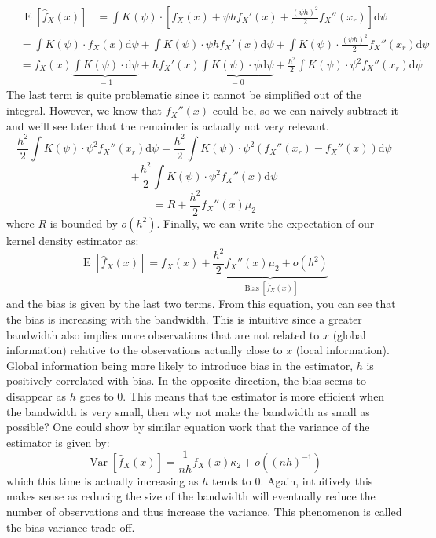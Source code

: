 \documentclass[12pt]{report}
\def\D{\mathrm{d}}
\newcommand{\E}[1]{\operatorname{E}\left[#1\right]}
\newcommand{\V}[1]{\operatorname{Var}\left[#1\right]}
\def\D{\mathrm{d}}
\def\D{\mathrm{d}}
\begin{document}
\begin{align*}
\E{\hat f_X(x)} & = \int K\left(\psi\right)\cdot \left[ f_X(x) + \psi h f_X'(x) + \frac{(\psi h)^2}{2}	 f_X''(x_r)\right] \D \psi  
\end{align*}
\begin{align*}
& = \int K\left(\psi\right)\cdot f_X(x) \D \psi  + \int K\left(\psi\right)\cdot \psi h f_X'(x) \D \psi + \int K\left(\psi\right)\cdot \frac{(\psi h)^2}{2}	 f_X''(x_r) \D \psi \\ & = f_X(x) \underbrace{\int K\left(\psi\right)\cdot \D \psi}_{=1}  + h f_X'(x)\underbrace{\int K\left(\psi\right)\cdot \psi \D \psi}_{=0} + \frac{h^2}{2}\int K\left(\psi\right)\cdot \psi^2	 f_X''(x_r) \D \psi
\end{align*}
The last term is quite problematic since it cannot be simplified out of the integral. However, we know that $f_X''(x)$ could be, so we can naively subtract it and we'll see later that the remainder is actually not very relevant. $$ \frac{h^2}{2}\int K\left(\psi\right)\cdot \psi^2	 f_X''(x_r) \D \psi = \frac{h^2}{2} \int K\left(\psi\right)\cdot \psi^2	 (f_X''(x_r) - f_X''(x)) \D \psi $$ $$ + \frac{h^2}{2} \int K\left(\psi\right)\cdot \psi^2 f_X''(x) \D \psi $$ $$ = R + \frac{h^2}{2}  f_X''(x) \mu_2 $$ where $R$ is bounded by $o(h^2)$. Finally, we can write the expectation of our kernel density estimator as: $$ \E{\hat f_X(x)} = f_X(x) + \underbrace{\frac{h^2}{2}  f_X''(x) \mu_2 + o(h^2)}_{\operatorname{Bias}\left[\hat f_X(x)\right]} $$ and the bias is given by the last two terms. From this equation, you can see that the bias is increasing with the bandwidth. This is intuitive since a greater bandwidth also implies more observations that are not related to $x$ (global information) relative to the observations actually close to $x$ (local information). Global information being more likely to introduce bias in the estimator, $h$ is positively correlated with bias. In the opposite direction, the bias seems to disappear as $h$ goes to 0. This means that the estimator is more efficient when the bandwidth is very small, then why not make the bandwidth as small as possible? One could show by similar equation work that the variance of the estimator is given by: $$
\V{\hat f_X(x)} = \frac{1}{nh}  f_X(x) \kappa_2 + o((nh)^{-1}) $$
which this time is actually increasing as $h$ tends to 0. Again, intuitively this makes sense as reducing the size of the bandwidth will eventually reduce the number of observations and thus increase the variance. This phenomenon is called the bias-variance trade-off.
\end{document}
